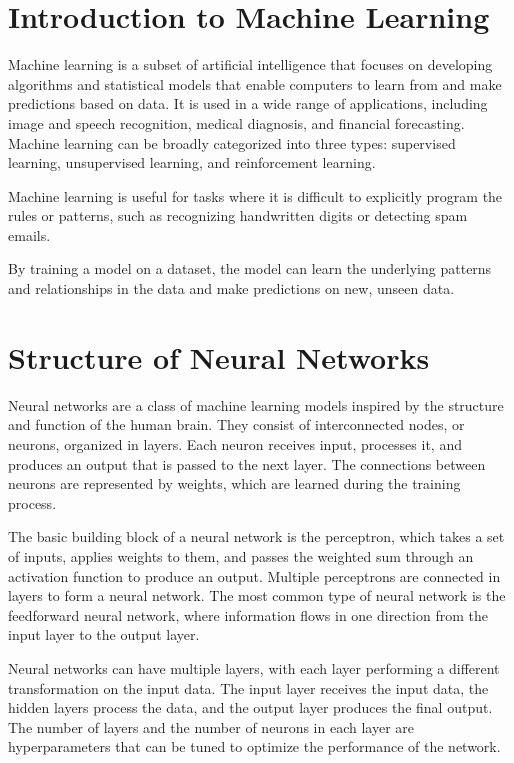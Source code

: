 \section{Introduction to Machine Learning}
    Machine learning is a subset of artificial intelligence that focuses on developing algorithms and statistical models that enable computers to learn from and make predictions based on data. 
    It is used in a wide range of applications, including image and speech recognition, medical diagnosis, and financial forecasting. 
    Machine learning can be broadly categorized into three types: supervised learning, unsupervised learning, and reinforcement learning.

    Machine learning is useful for tasks where it is difficult to explicitly program the rules or patterns, such as recognizing handwritten digits or detecting spam emails.

    By training a model on a dataset, the model can learn the underlying patterns and relationships in the data and make predictions on new, unseen data.

\section{Structure of Neural Networks}
    Neural networks are a class of machine learning models inspired by the structure and function of the human brain. They consist of interconnected nodes, or neurons, organized in layers. Each neuron receives input, processes it, and produces an output that is passed to the next layer. The connections between neurons are represented by weights, which are learned during the training process.

    \vspace{1em} \noindent The basic building block of a neural network is the perceptron, which takes a set of inputs, applies weights to them, and passes the weighted sum through an activation function to produce an output. Multiple perceptrons are connected in layers to form a neural network. The most common type of neural network is the feedforward neural network, where information flows in one direction from the input layer to the output layer.

    \vspace{1em} \noindent Neural networks can have multiple layers, with each layer performing a different transformation on the input data. The input layer receives the input data, the hidden layers process the data, and the output layer produces the final output. The number of layers and the number of neurons in each layer are hyperparameters that can be tuned to optimize the performance of the network.

